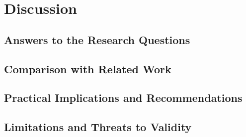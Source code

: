 \chapter{Discussion}\label{ch:discussion}
\section{Answers to the Research Questions}
\section{Comparison with Related Work}
\section{Practical Implications and Recommendations}
\section{Limitations and Threats to Validity}
